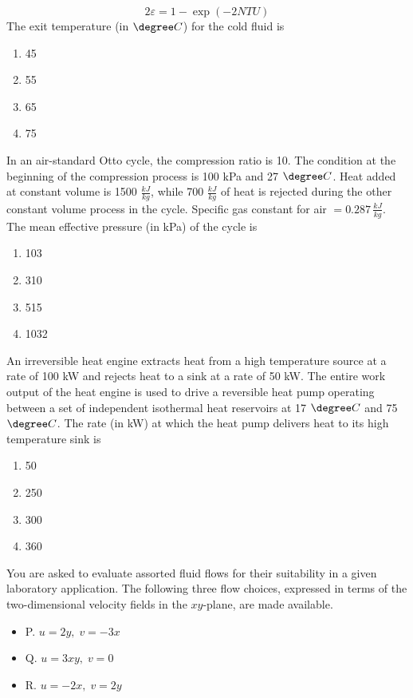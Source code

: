  $$ 2\varepsilon = 1 - \exp(-2 NTU) $$
 The exit temperature (in $\degree C$) for the cold fluid is
  \begin{enumerate}
    \item  45
    \item  55
    \item  65
    \item  75
  \end{enumerate}
\item In an air-standard Otto cycle, the compression ratio is 10. The condition at the beginning of the compression process is 100 kPa and 27 $\degree C$. Heat added at constant volume is 1500 $\frac{kJ}{kg}$, while 700 $\frac{kJ}{kg}$ of heat is rejected during the other constant volume process in the cycle. Specific gas constant for air $= 0.287 \, \frac{kJ}{kg}$. The mean effective pressure (in kPa) of the cycle is
\begin{enumerate}
    \item  103
    \item  310
    \item  515
    \item  1032
  \end{enumerate}
  \item An irreversible heat engine extracts heat from a high temperature source at a rate of 100 kW and rejects heat to a sink at a rate of 50 kW. The entire work output of the heat engine is used to drive a reversible heat pump operating between a set of independent isothermal heat reservoirs at 17 $\degree C$ and 75 $\degree C$. The rate (in kW) at which the heat pump delivers heat to its high temperature sink is
  \begin{enumerate}
    \item  50
    \item  250
    \item  300
    \item  360
  \end{enumerate}
  \item You are asked to evaluate assorted fluid flows for their suitability in a given laboratory application. The following three flow choices, expressed in terms of the two-dimensional velocity fields in the $xy$-plane, are made available.
\begin{itemize}
    \item P. $u = 2y, \; v = -3x$
    \item Q. $u = 3xy, \; v = 0$
    \item R. $u = -2x, \; v = 2y$
\end{itemize}
